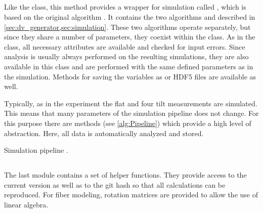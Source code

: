 \subsection{}
% 
Like the  class, this method provides a wrapper for simulation called , which is based on the original algorithm \cite{Dohmen2015,Lucksch2016}.
It contains the two algorithms  and  described in \cref{sec:dv_generator,sec:simulation}.
These two algorithms operate separately, but since they share a number of parameters, they coexist within the class.
As in the  class, all necessary attributes are available and checked for input errors.
Since analysis is usually always performed on the resulting simulations, they are also available in this class and are performed with the same defined parameters as in the simulation.
Methods for saving the variables as  or \ac{HDF5} files are available as well.
\par
% 
Typically, as in the experiment the flat and four tilt measurements are simulated.
This means that many parameters of the simulation pipeline does not change.
For this purpose there are  methods (see \cref{alg:Pipeline}) which provide a high level of abstraction.
Here, all data is automatically analyzed and stored.
%
\begin{lstfloat}[!tb]
\centering
\scalebox{0.75}{
\begin{minipage}{\the\textwidth}

\end{minipage}}
\caption{Simulation pipeline .}
\label{alg:Pipeline}
\end{lstfloat}
%
%
\subsection{}
% 
The last module contains a set of helper functions.
They provide access to the current version as well as to the git hash so that all calculations can be reproduced.
For fiber modeling, rotation matrices are provided to allow the use of linear algebra.
% 
% 
% 

